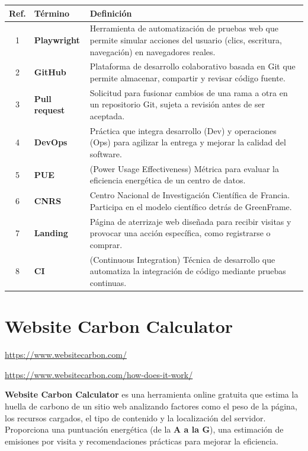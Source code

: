 \documentclass[12pt,a4paper]{report}
\begin{document}
\begin{table}[h]
\centering
\begin{tabular}{@{}cll@{}}
\toprule
\textbf{Ref.} & \textbf{Término} & \textbf{Definición} \\
\midrule
1 & \textbf{Playwright} & Herramienta de automatización de pruebas web que permite simular acciones del usuario (clics, escritura, navegación) en navegadores reales. \\
2 & \textbf{GitHub} & Plataforma de desarrollo colaborativo basada en Git que permite almacenar, compartir y revisar código fuente. \\
3 & \textbf{Pull request} & Solicitud para fusionar cambios de una rama a otra en un repositorio Git, sujeta a revisión antes de ser aceptada. \\
4 & \textbf{DevOps} & Práctica que integra desarrollo (Dev) y operaciones (Ops) para agilizar la entrega y mejorar la calidad del software. \\
5 & \textbf{PUE} & (Power Usage Effectiveness) Métrica para evaluar la eficiencia energética de un centro de datos. \\
6 & \textbf{CNRS} & Centro Nacional de Investigación Científica de Francia. Participa en el modelo científico detrás de GreenFrame. \\
7 & \textbf{Landing} & Página de aterrizaje web diseñada para recibir visitas y provocar una acción específica, como registrarse o comprar. \\
8 & \textbf{CI} & (Continuous Integration) Técnica de desarrollo que automatiza la integración de código mediante pruebas continuas. \\
\bottomrule
\end{tabular}
\end{table}

\section*{\textbf{Website Carbon Calculator}}

\url{https://www.websitecarbon.com/}

\url{https://www.websitecarbon.com/how-does-it-work/}

\textbf{Website Carbon Calculator} es una herramienta online gratuita que estima la huella de carbono de un sitio web analizando factores como el peso de la página, los recursos cargados, el tipo de contenido y la localización del servidor. Proporciona una puntuación energética (de la \textbf{A a la G}), una estimación de emisiones por visita y recomendaciones prácticas para mejorar la eficiencia.
\end{document}
